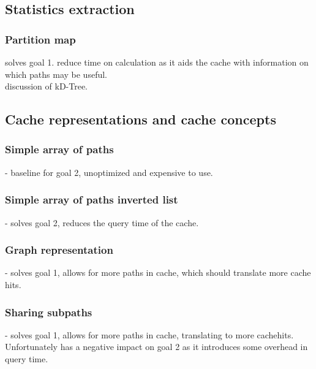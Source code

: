 \subsection{Statistics extraction}

\subsubsection{Partition map} 
solves goal 1. reduce time on \spath calculation as it aids the cache with information on which paths may be useful.\\ 
discussion of kD-Tree.


\subsection{Cache representations and cache concepts} 

\subsubsection{Simple array of paths} - baseline for goal 2, unoptimized and expensive to use.

\subsubsection{Simple array of paths inverted list} - solves goal 2, reduces the query time of the cache.

\subsubsection{Graph representation} - solves goal 1, allows for more paths in cache, which should translate more cache hits.

\subsubsection{Sharing subpaths} - solves goal 1, allows for more paths in cache, translating to more cachehits. Unfortunately has a negative impact on goal 2 as it introduces some overhead in query time.

